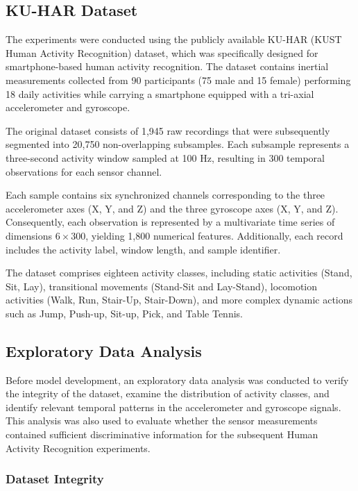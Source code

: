 \documentclass[journal]{IEEEtran}
\begin{document}
\subsection{KU-HAR Dataset}

The experiments were conducted using the publicly available KU-HAR (KUST Human Activity Recognition) dataset, which was specifically designed for smartphone-based human activity recognition. The dataset contains inertial measurements collected from 90 participants (75 male and 15 female) performing 18 daily activities while carrying a smartphone equipped with a tri-axial accelerometer and gyroscope.

The original dataset consists of 1,945 raw recordings that were subsequently segmented into 20,750 non-overlapping subsamples. Each subsample represents a three-second activity window sampled at 100 Hz, resulting in 300 temporal observations for each sensor channel.

Each sample contains six synchronized channels corresponding to the three accelerometer axes (X, Y, and Z) and the three gyroscope axes (X, Y, and Z). Consequently, each observation is represented by a multivariate time series of dimensions \(6 \times 300\), yielding 1,800 numerical features. Additionally, each record includes the activity label, window length, and sample identifier.

The dataset comprises eighteen activity classes, including static activities (Stand, Sit, Lay), transitional movements (Stand-Sit and Lay-Stand), locomotion activities (Walk, Run, Stair-Up, Stair-Down), and more complex dynamic actions such as Jump, Push-up, Sit-up, Pick, and Table Tennis.

\subsection{Exploratory Data Analysis}

Before model development, an exploratory data analysis was conducted to verify the integrity of the dataset, examine the distribution of activity classes, and identify relevant temporal patterns in the accelerometer and gyroscope signals. This analysis was also used to evaluate whether the sensor measurements contained sufficient discriminative information for the subsequent Human Activity Recognition experiments.

\subsubsection{Dataset Integrity}
\end{document}
